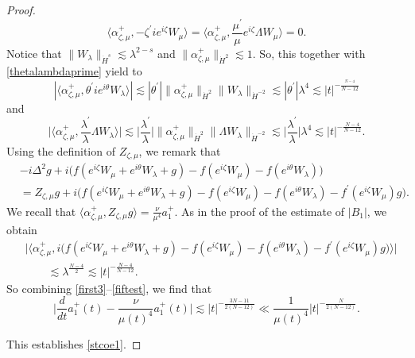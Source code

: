 \documentclass[a4paper,two-side,10pt]{amsart}
\numberwithin{equation}{section}
\begin{document}
\begin{proof}
\begin{equation}\label{nexttwo}
\big\langle \alpha^+_{\zeta ,\mu} , -\zeta^\prime i e^{i\zeta} W_\mu  \big\rangle =\Big\langle \alpha^+_{\zeta ,\mu} ,  \frac{\mu^\prime}{\mu} e^{i\zeta}\Lambda W_\mu \Big\rangle =0.
\end{equation}
Notice that $\|W_\lambda \|_{\dot{H}^s} \lesssim \lambda^{2-s}$ and $\|\alpha_{\zeta ,\mu}^+\|_{\dot{H}^2}\lesssim 1$. So, this together with \eqref{thetalambdaprime} yield to
\begin{equation}\label{thirdest}
|\langle \alpha^+_{\zeta ,\mu} ,\theta^\prime i e^{i\theta} W_\lambda  \rangle  | \lesssim |\theta^\prime| \|\alpha_{\zeta ,\mu}^+\|_{\dot{H}^2}\|W_\lambda \|_{\dot{H}^{-2}} \lesssim |\theta^\prime| \lambda^4
\lesssim |t|^{-\frac{^{N-4}}{N-12}}
\end{equation}
and
\begin{equation}\label{fourthest}
\Big| \Big\langle \alpha^+_{\zeta ,\mu} ,\frac{\lambda^\prime}{\lambda} \Lambda W_\lambda  \Big\rangle  \Big| \lesssim \Big|\frac{\lambda^\prime}{\lambda}\Big| \|\alpha_{\zeta ,\mu}^+\|_{\dot{H}^2}\|\Lambda W_\lambda \|_{\dot{H}^{-2}} \lesssim \Big|\frac{\lambda^\prime}{\lambda}\Big| \lambda^4
\lesssim |t|^{-\frac{N-4}{N-12}} . 
\end{equation}
Using the definition of $Z_{\zeta ,\mu}$, we remark that
\begin{align*}
&-i \Delta^2 g  +i\big(f(e^{i\zeta} W_\mu +e^{i\theta} W_\lambda +g) - f(e^{i\zeta} W_\mu ) - f(e^{i\theta }W_\lambda)\big)\\
&=Z_{\zeta ,\mu}g +i\big(f(e^{i\zeta} W_\mu +e^{i\theta} W_\lambda +g) - f(e^{i\zeta} W_\mu ) - f(e^{i\theta }W_\lambda) - f^\prime (e^{i\zeta} W_\mu) g\big).
\end{align*}
We recall that $\langle \alpha^+_{\zeta ,\mu} , Z_{\zeta ,\mu}g \rangle = \frac{\nu}{\mu^4} a_1^+$. As in the proof of the estimate of $|B_1|$, we obtain 
\begin{align}\label{fiftest}
&\big|\big\langle \alpha^+_{\zeta ,\mu} , i\big(f(e^{i\zeta} W_\mu +e^{i\theta} W_\lambda +g) - f(e^{i\zeta} W_\mu ) - f(e^{i\theta }W_\lambda) - f^\prime (e^{i\zeta} W_\mu) g\big) \big\rangle\big|\nonumber\\
&\qquad \lesssim \lambda^{\frac{N-4}{2}}
\lesssim |t|^{-\frac{N-4}{N-12}}.
\end{align}
So combining \eqref{first3}--\eqref{fiftest}, we find that
$$\Big|\frac{d}{dt}a_1^+ (t) - \frac{\nu}{\mu (t)^4} a_1^+ (t)\Big| \lesssim  
|t|^{-\frac{3N-11}{2(N-12)}}\ll \frac{1}{\mu(t)^4}|t|^{-\frac{N}{2(N-12)}}.
$$

This establishes \eqref{stcoe1}.


\end{proof}
\end{document}
